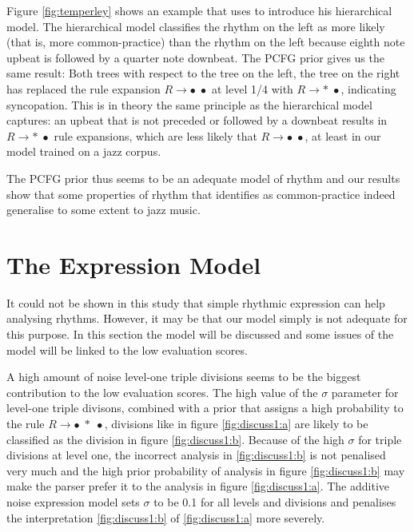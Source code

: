 Figure \ref{fig:temperley} shows an example that \citet{temperley2010modeling} uses to introduce his hierarchical model. The hierarchical model classifies the rhythm on the left as more likely (that is, more common-practice) than the rhythm on the left because eighth note upbeat is followed by a quarter note downbeat. The PCFG prior gives us the same result: Both trees with respect to the tree on the left, the tree on the right has replaced the rule expansion $R \rightarrow \bullet\; \bullet$ at level 1/4 with $R \rightarrow *\; \bullet$, indicating syncopation. This is in theory the same principle as the hierarchical model captures: an upbeat that is not preceded or followed by a downbeat results in $R \rightarrow *\; \bullet$ rule expansions, which are less likely that $R \rightarrow \bullet\; \bullet$, at least in our model trained on a jazz corpus.

The PCFG prior thus seems to be an adequate model of rhythm and our results show that some properties of rhythm that \citet{temperley2010modeling} identifies as common-practice indeed generalise to some extent to jazz music.

\section{The Expression Model}

It could not be shown in this study that simple rhythmic expression can help analysing rhythms. However, it may be that our model simply is not adequate for this purpose. In this section the model will be discussed and some issues of the model will be linked to the low evaluation scores.

A high amount of noise level-one triple divisions seems to be the biggest contribution to the low evaluation scores. The high value of the $\sigma$ parameter for level-one triple divisons, combined with a prior that assigns a high probability to the rule $R \rightarrow \bullet\; *\; \bullet$, divisions like in figure \ref{fig:discuss1:a} are likely to be classified as the division in figure \ref{fig:discuss1:b}. Because of the high $\sigma$ for triple divisions at level one, the incorrect analysis in \ref{fig:discuss1:b} is not penalised very much and the high prior probability of analysis in figure \ref{fig:discuss1:b} may make the parser prefer it to the analysis in figure \ref{fig:discuss1:a}. The additive noise expression model sets $\sigma$ to be 0.1 for all levels and divisions and penalises the interpretation \ref{fig:discuss1:b} of \ref{fig:discuss1:a} more severely.

